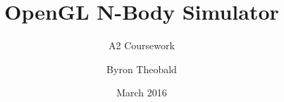 \begin{titlepage}

\subject{Computing}

\title{OpenGL N-Body Simulator}

\subtitle{A2 Coursework}

\author{Byron Theobald}
\date{March 2016}

\publishers{Northgate Sixth Form}

\clearpage
\maketitle

\thispagestyle{empty}

\end{titlepage}